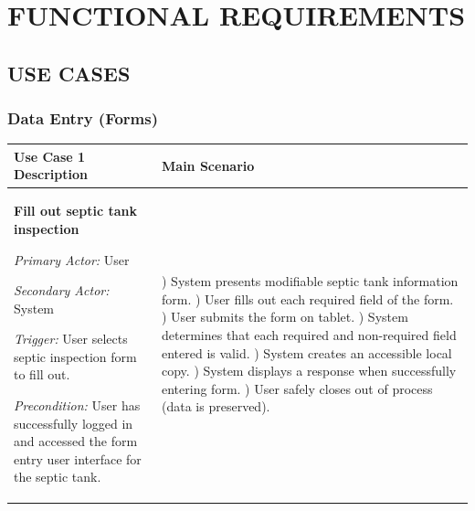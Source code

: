 \documentclass[twoside,letterpaper]{article}
\begin{document}
\clearpage\section[FUNCTIONAL REQUIREMENTS]{\rmfamily\bfseries\color{black}
FUNCTIONAL REQUIREMENTS}
\subsection[USE CASES]{\rmfamily\bfseries\color{black}
USE CASES}
\bigskip
\subsubsection{Data Entry (Forms)}
\begin{flushleft}
\tablehead{}
\begin{supertabular}{|m{3.17056in}|m{3.5in}|}
\hline

\bfseries\color{black} Use Case 1 Description &
Main Scenario
\\\hline
{\bfseries\color{black} Fill out septic tank inspection}

{\color{black} \textit{Primary Actor:} User}

{\color{black} \textit{Secondary Actor:} System}

{\color{black} \textit{Trigger:} User selects septic inspection form to fill out.}

{\color{black} \textit{Precondition:} User has successfully logged in and accessed the form entry user interface for the septic tank.}
~
 &
) System presents modifiable septic tank information form.
) User fills out each required field of the form.
) User submits the form on tablet.
) System determines that each required and non-required field entered is valid.
) System creates an accessible local copy.
) System displays a response when successfully entering form.
) User safely closes out of process (data is preserved).

\\\hline
\end{supertabular}
\end{flushleft}
\end{document}
